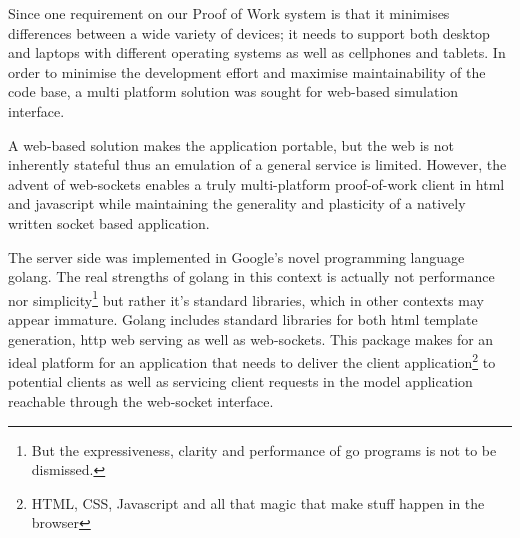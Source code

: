 
Since one requirement on our Proof of Work system is that it minimises differences between a wide variety of devices; it needs to support both desktop and laptops with different operating systems as well as cellphones and tablets.
In order to minimise the development effort and maximise maintainability of the code base, a multi platform solution was sought for web-based simulation interface. 

A web-based solution makes the application portable, but the web is not inherently stateful thus an emulation of a general service is limited. However, the advent of web-sockets enables a truly multi-platform proof-of-work client in html and javascript while maintaining the generality and plasticity of a natively written socket based application. 
\begin{comment}
The javascript implementation for handling the protocol is quite simple:
The solution finding part also need to be presented:
To trigger a request to be sent to the server we build the following function which is then registered to the onclick event of a button in the web gui:

\end{comment}

The server side was implemented in Google's novel programming language golang\cite{golang}. The real strengths of golang in this context is actually not performance nor simplicity\footnote{But the expressiveness, clarity and performance of go programs is not to be dismissed.} but rather it's standard libraries, which in other contexts may appear immature. Golang includes standard libraries for both html template generation, http web serving as well as web-sockets. This package makes for an ideal platform for an application that needs to deliver the client application\footnote{HTML, CSS, Javascript and all that magic that make stuff happen in the browser} to potential clients as well as servicing client requests in the model application reachable through the web-socket interface. 

